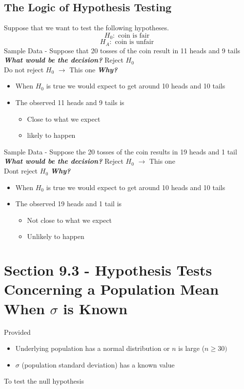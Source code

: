 \documentclass{report}
\begin{document}
\pagebreak
\subsection*{The Logic of Hypothesis Testing}
\bigbreak \noindent
Suppose that we want to test the following hypotheses.
$$ H_0 : \text{ coin is fair}$$
$$ H_A : \text { coin is unfair}$$
\bigbreak \noindent
\noindent Sample Data - Suppose that 20 tosses of the coin result in 11 heads and 9 tails
\bigbreak \noindent
\textit{\textbf{What would be the decision?}}
\bigbreak \noindent
Reject $H_0$ \\ 
Do not reject $H_0$ $\rightarrow$ This one
\bigbreak \noindent
\textit{\textbf{Why?}}
\begin{itemize}
  \item When $H_0$ is true we would expect to get around 10 heads and 10 tails 
  \item The observed 11 heads and 9 tails is
    \begin{itemize}[label=$\circ$]
      \item Close to what we expect 
      \item likely to happen
    \end{itemize}
\end{itemize}
\bigbreak \noindent
Sample Data - Suppose the 20 tosses of the coin results in 19 heads and 1 tail
\bigbreak \noindent
\textit{\textbf{What would be the decision?}}
\bigbreak \noindent
Reject $H_0$ $\rightarrow$ This one \\
Dont reject $H_0$
\bigbreak \noindent
\textit{\textbf{Why?}}
\begin{itemize}
  \item When $H_0$ is true we would expect to get around 10 heads and 10 tails 
  \item The observed 19 heads and 1 tail is
    \begin{itemize}[label=$\circ$]
      \item Not close to what we expect 
      \item Unlikely to happen
    \end{itemize}
\end{itemize}
\bigbreak \noindent
{}

\pagebreak
\section*{Section 9.3 - Hypothesis Tests Concerning a Population Mean When $\sigma$ is Known}
\bigbreak \noindent
Provided
\begin{itemize}
  \item Underlying population has a normal distribution or $n$ is large ($ n \geq 30)$
  \item $\sigma$ (population standard deviation) has a known value
\end{itemize}
\bigbreak \noindent
To test the null hypothesis
\end{document}
